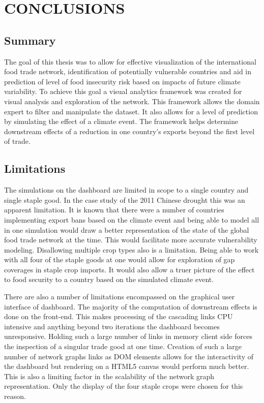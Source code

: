 \chapter{CONCLUSIONS}
\label{conclusionsChapter}
\section{Summary}
The goal of this thesis was to allow for effective visualization of the international food trade network, identification of potentially vulnerable countries and aid in prediction of level of food insecurity risk based on impacts of future climate variability. To achieve this goal a visual analytics framework was created for visual analysis and exploration of the network. This framework allows the domain expert to filter and manipulate the dataset. It also allows for a level of prediction by simulating the effect of a climate event. The framework helps determine downstream effects of a reduction in one country's exports beyond the first level of trade.\par
\section{Limitations}
The simulations on the dashboard are limited in scope to a single country and single staple good. In the case study of the 2011 Chinese drought this was an apparent limitation. It is known that there were a number of countries implementing export bans \citep{fellmann2014harvest} based on the climate event and being able to model all in one simulation would draw a better representation of the state of the global food trade network at the time. This would facilitate more accurate vulnerability modeling. Disallowing multiple crop types also is a limitation. Being able to work with all four of the staple goods at one would allow for exploration of gap coverages in staple crop imports. It would also allow a truer picture of the effect to food security to a country based on the simulated climate event.\par
There are also a number of limitations encompassed on the graphical user interface of dashboard. The majority of the computation of downstream effects is done on the front-end. This makes processing of the cascading links CPU intensive and anything beyond two iterations the dashboard becomes unresponsive. Holding such a large number of links in memory client side forces the inspection of a singular trade good at one time. Creation of such a large number of network graphs links as DOM elements allows for the interactivity of the dashboard but rendering on a HTML5 canvas would perform much better. This is also a limiting factor in the scalability of the network graph representation. Only the display of the four staple crops were chosen for this reason.\par
